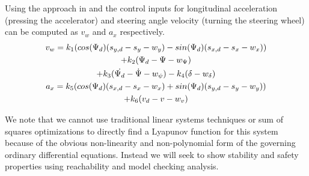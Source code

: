 

Using the approach in \cite{Snider2009} and \cite{Althoff2014} the control inputs for longitudinal acceleration (pressing the accelerator) and steering angle velocity (turning the steering wheel) can be computed as $v_w$ and $a_x$ respectively. 
\begin{gather}
	v_w=k_1(cos{(\Psi_d)}(s_{y,d}-s_y-w_y)-sin{(\Psi_d)}(s_{x,d}-s_x-w_x)) \notag \\ +k_2(\Psi_d-\Psi-w_{\Psi}) \notag \\ +k_3(\dot{\Psi_d}-\dot{\Psi}-w_{\psi})-k_4(\delta-w_{\delta})
	\\
	a_x=k_5(cos{(\Psi_d)}(s_{x,d}-s_x-w_x)+sin{(\Psi_d)}(s_{y,d}-s_y-w_y)) \notag \\ +k_6(v_d-v-w_v)
\end{gather}

We note that we cannot use traditional linear systems techniques or sum of squares optimizations to directly find a Lyapunov function for this system because of the obvious non-linearity and non-polynomial form of the governing ordinary differential equations. Instead we will seek to show stability and safety properties using reachability and model checking analysis.

